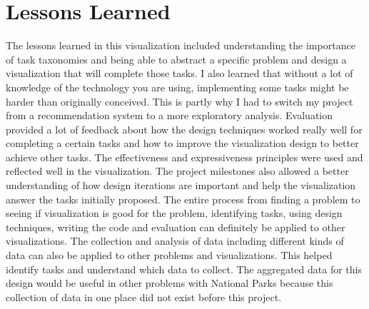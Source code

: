 \section{Lessons Learned}

The lessons learned in this visualization included understanding the importance of task taxonomies and being able to abstract a specific problem and design a visualization that will complete those tasks. I also learned that without a lot of knowledge of the technology you are using, implementing some tasks might be harder than originally conceived. This is partly why I had to switch my project from a recommendation system to a more exploratory analysis. Evaluation provided a lot of feedback about how the design techniques worked really well for completing a certain tasks and how to improve the visualization design to better achieve other tasks. The effectiveness and expressiveness principles were used and reflected well in the visualization. The project milestones also allowed a better understanding of how design iterations are important and help the visualization answer the tasks initially proposed. The entire process from finding a problem to seeing if visualization is good for the problem, identifying tasks, using design techniques, writing the code and evaluation can definitely be applied to other visualizations. The collection and analysis of data including different kinds of data can also be applied to other problems and visualizations. This helped identify tasks and understand which data to collect. The aggregated data for this design would be useful in other problems with National Parks because this collection of data in one place did not exist before this project.